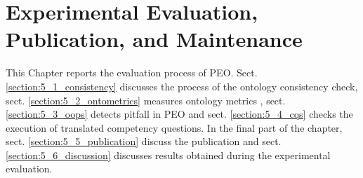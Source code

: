 \chapter{Experimental Evaluation, Publication, and Maintenance}
\label{chapter:5_evaluation}

This Chapter reports the evaluation process of PEO. Sect. \ref{section:5_1_consistency} discusses the process of the ontology consistency check,
sect. \ref{section:5_2_ontometrics} measures ontology metrics , sect. \ref{section:5_3_oops} detects pitfall in PEO and sect. \ref{section:5_4_cqs} checks the execution of translated competency questions. In the final part of the chapter, sect. \ref{section:5_5_publication} discuss the publication and sect. \ref{section:5_6_discussion} discusses results obtained during the experimental evaluation.

